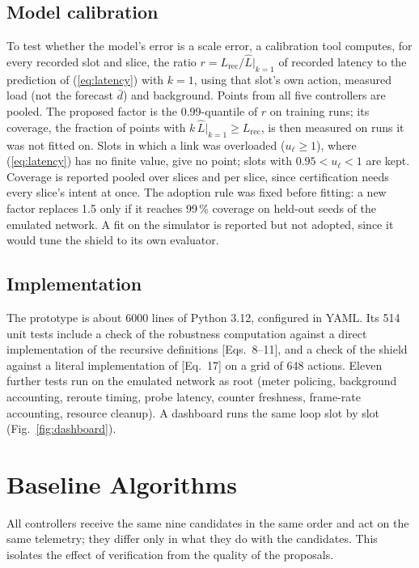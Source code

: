\documentclass[conference]{IEEEtran}
\newcommand{\dbar}{\bar{d}}
\begin{document}
\subsection{Model calibration}
To test whether the model's error is a scale error, a calibration tool computes, for
every recorded slot and slice, the ratio $r = L_{\mathrm{rec}}/\hat{L}|_{k=1}$ of recorded latency to the
prediction of (\ref{eq:latency}) with $k=1$, using that slot's own action, measured
load (not the forecast $\dbar$) and background. Points from all five controllers are
pooled. The proposed factor is the 0.99-quantile of $r$ on training runs; its
coverage, the fraction of points with $k\,\hat{L}|_{k=1}\ge L_{\mathrm{rec}}$, is then
measured on runs it was not fitted on. Slots in which a link was overloaded
($u_\ell \ge 1$), where (\ref{eq:latency}) has no finite value, give no point; slots
with $0.95 < u_\ell < 1$ are kept. Coverage is reported pooled over slices and per
slice, since certification needs every slice's intent at once. The adoption rule was fixed before fitting: a new factor replaces 1.5 only if it
reaches 99\,\% coverage on held-out seeds of the emulated network. A fit on the
simulator is reported but not adopted, since it would tune the shield to its own
evaluator.

\subsection{Implementation}
The prototype is about 6000 lines of Python 3.12, configured in YAML. Its 514 unit
tests include a check of the robustness computation against a direct implementation
of the recursive definitions [Eqs.~8--11], and a check of the shield against a
literal implementation of [Eq.~17] on a grid of 648 actions. Eleven further tests
run on the emulated network as root (meter policing, background accounting, reroute
timing, probe latency, counter freshness, frame-rate accounting, resource cleanup).
A dashboard runs the same loop slot by slot (Fig.~\ref{fig:dashboard}).

\section{Baseline Algorithms}
\label{sec:baselines}

All controllers receive the same nine candidates in the same order and act on the
same telemetry; they differ only in what they do with the candidates. This isolates
the effect of verification from the quality of the proposals.
\end{document}
